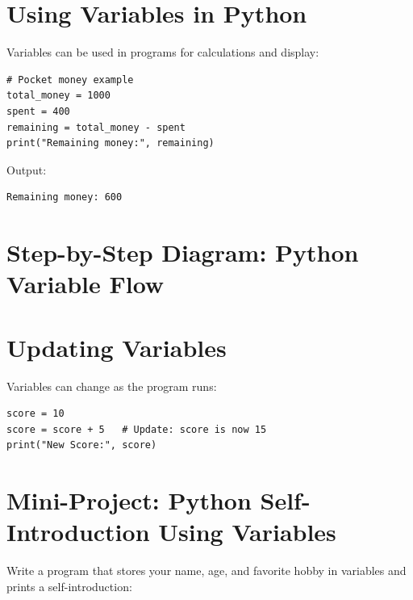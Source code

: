 \section{Using Variables in Python}

Variables can be used in programs for calculations and display:

\begin{verbatim}
# Pocket money example
total_money = 1000
spent = 400
remaining = total_money - spent
print("Remaining money:", remaining)
\end{verbatim}

Output:

\begin{verbatim}
Remaining money: 600
\end{verbatim}

\section{Step-by-Step Diagram: Python Variable Flow}

\begin{center}
\end{center}

\section{Updating Variables}

Variables can change as the program runs:

\begin{verbatim}
score = 10
score = score + 5   # Update: score is now 15
print("New Score:", score)
\end{verbatim}

\section{Mini-Project: Python Self-Introduction Using Variables}

Write a program that stores your name, age, and favorite hobby in variables and prints a self-introduction:

